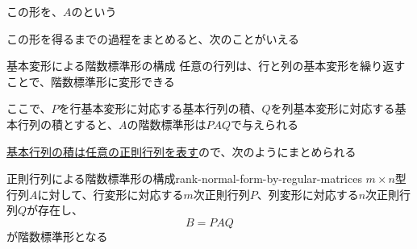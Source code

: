 \documentclass[../../../topic_linear-algebra]{subfiles}
\begin{document}
\br

この形を、$A$のという

この形を得るまでの過程をまとめると、次のことがいえる

\begin{theorem*}{基本変形による階数標準形の構成}
  任意の行列は、行と列の基本変形を繰り返すことで、階数標準形に変形できる
\end{theorem*}

\br

ここで、$P$を行基本変形に対応する基本行列の積、$Q$を列基本変形に対応する基本行列の積とすると、$A$の階数標準形は$PAQ$で与えられる

\br

\hyperref[thm:invertible-as-product-of-elementary]{基本行列の積は任意の正則行列を表す}ので、次のようにまとめられる

\begin{theorem}{正則行列による階数標準形の構成}{rank-normal-form-by-regular-matrices}
  $m \times n$型行列$A$に対して、行変形に対応する$m$次正則行列$P$、列変形に対応する$n$次正則行列$Q$が存在し、
  \begin{equation*}
    B = PAQ
  \end{equation*}
  が階数標準形となる
\end{theorem}
\end{document}
